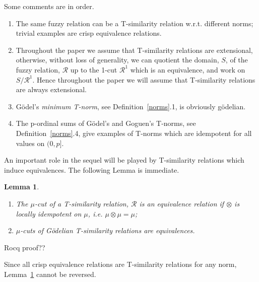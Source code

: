 \documentclass{article}
\def\ie{{\em i.e. }}
\newcommand{\cR}{{\mathcal R}}
\newtheorem{lemma}{Lemma}[section]
\begin{document}
Some comments are in order.
\begin{enumerate}
\item The same fuzzy relation can be a T-similarity relation w.r.t. different norms; trivial examples are crisp equivalence relations. 
\item Throughout the paper we assume that T-similarity relations are extensional, otherwise, without loss of generality, we can quotient the domain, $S$, of the fuzzy relation, $\cR$ up to the 1-cut $\cR^1$ which is an equivalence, and work on $S/\cR^1$. Hence throughout the paper we will assume that T-similarity relations are always extensional.
\item G\"odel's {\em minimum T-norm}, see Definition~\ref{norms}.1, is obviously g\"odelian.
\item The p-ordinal sums of G\"odel's and Goguen's T-norms, see Definition~\ref{norms}.4, give examples of T-norms which are idempotent for all values on $(0,p]$.
\end{enumerate}
An important role in the sequel will be played by T-similarity relations which induce equivalences.
The following Lemma is immediate.
\begin{lemma}\label{T-equivalence}\hfill \begin{enumerate} 
\item The $\mu$-cut of a T-similarity relation, $\cR$ is an equivalence relation if $\otimes$ is locally idempotent on $\mu$, \ie 
$\mu\otimes\mu=\mu$;
\item $\mu$-cuts of G\"odelian T-similarity relations are equivalences. 
\end{enumerate}
\end{lemma}
{\color{red} Rocq proof??}\vspace{0.5cm}

Since all crisp equivalence relations are T-similarity relations for any norm, Lemma~\ref{T-equivalence} cannot be reversed. 
\end{document}
